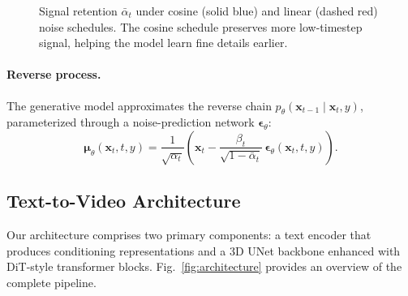 \documentclass{ieeeaccess}
\begin{document}
\begin{figure}[H]
    \centering
    \caption{Signal retention $\bar{\alpha}_t$ under cosine (solid blue) and linear (dashed red) noise schedules. The cosine schedule preserves more low-timestep signal, helping the model learn fine details earlier.}
    \label{fig:noise_schedule}
\end{figure}

\paragraph{Reverse process.} The generative model approximates the reverse chain $p_\theta(\mathbf{x}_{t-1} \mid \mathbf{x}_t, y)$, parameterized through a noise-prediction network $\boldsymbol{\epsilon}_\theta$:
\begin{equation}
    \boldsymbol{\mu}_\theta(\mathbf{x}_t, t, y) = \frac{1}{\sqrt{\alpha_t}} \left(\mathbf{x}_t - \frac{\beta_t}{\sqrt{1-\bar{\alpha}_t}}\,\boldsymbol{\epsilon}_\theta(\mathbf{x}_t, t, y)\right).
\end{equation}

\subsection{Text-to-Video Architecture}
\label{subsec:architecture}

Our architecture comprises two primary components: a text encoder that produces conditioning representations and a 3D UNet backbone enhanced with DiT-style transformer blocks. Fig.~\ref{fig:architecture} provides an overview of the complete pipeline.
\end{document}
